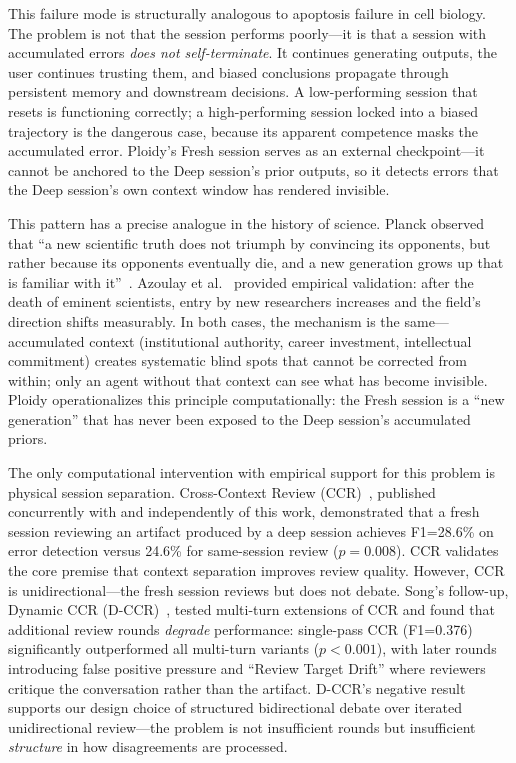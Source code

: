 \documentclass[11pt]{article}
\begin{document}
This failure mode is structurally analogous to apoptosis failure in cell biology. The problem is not that the session performs poorly---it is that a session with accumulated errors \emph{does not self-terminate}. It continues generating outputs, the user continues trusting them, and biased conclusions propagate through persistent memory and downstream decisions. A low-performing session that resets is functioning correctly; a high-performing session locked into a biased trajectory is the dangerous case, because its apparent competence masks the accumulated error. Ploidy's Fresh session serves as an external checkpoint---it cannot be anchored to the Deep session's prior outputs, so it detects errors that the Deep session's own context window has rendered invisible.

This pattern has a precise analogue in the history of science. Planck observed that ``a new scientific truth does not triumph by convincing its opponents, but rather because its opponents eventually die, and a new generation grows up that is familiar with it''~\citep{planck1950}. Azoulay et al.~\citep{azoulay2019} provided empirical validation: after the death of eminent scientists, entry by new researchers increases and the field's direction shifts measurably. In both cases, the mechanism is the same---accumulated context (institutional authority, career investment, intellectual commitment) creates systematic blind spots that cannot be corrected from within; only an agent without that context can see what has become invisible. Ploidy operationalizes this principle computationally: the Fresh session is a ``new generation'' that has never been exposed to the Deep session's accumulated priors.

The only computational intervention with empirical support for this problem is physical session separation. Cross-Context Review (CCR)~\citep{song2026ccr}, published concurrently with and independently of this work, demonstrated that a fresh session reviewing an artifact produced by a deep session achieves F1=28.6\% on error detection versus 24.6\% for same-session review ($p=0.008$). CCR validates the core premise that context separation improves review quality. However, CCR is unidirectional---the fresh session reviews but does not debate. Song's follow-up, Dynamic CCR (D-CCR)~\citep{song2026dccr}, tested multi-turn extensions of CCR and found that additional review rounds \emph{degrade} performance: single-pass CCR (F1=0.376) significantly outperformed all multi-turn variants ($p<0.001$), with later rounds introducing false positive pressure and ``Review Target Drift'' where reviewers critique the conversation rather than the artifact. D-CCR's negative result supports our design choice of structured bidirectional debate over iterated unidirectional review---the problem is not insufficient rounds but insufficient \emph{structure} in how disagreements are processed.
\end{document}
